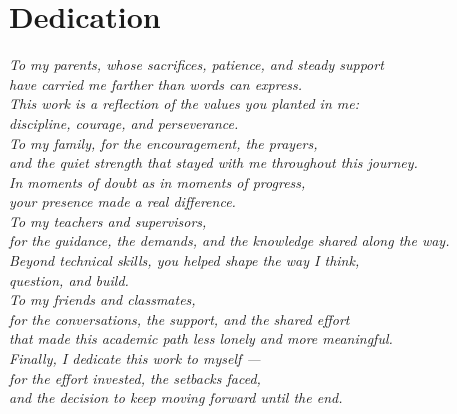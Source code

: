 \documentclass[a4paper,12pt,oneside]{report}
\begin{document}
%



\section*{Dedication}
\vspace*{2cm}

\justifying
\textit{To my parents, whose sacrifices, patience, and steady support}\\
\textit{have carried me farther than words can express.}\\
\textit{This work is a reflection of the values you planted in me:}\\
\textit{discipline, courage, and perseverance.}\\[0.8cm]

\textit{To my family, for the encouragement, the prayers,}\\
\textit{and the quiet strength that stayed with me throughout this journey.}\\
\textit{In moments of doubt as in moments of progress,}\\
\textit{your presence made a real difference.}\\[0.8cm]

\textit{To my teachers and supervisors,}\\
\textit{for the guidance, the demands, and the knowledge shared along the way.}\\
\textit{Beyond technical skills, you helped shape the way I think,}\\
\textit{question, and build.}\\[0.8cm]

\textit{To my friends and classmates,}\\
\textit{for the conversations, the support, and the shared effort}\\
\textit{that made this academic path less lonely and more meaningful.}\\[1cm]

\textit{Finally, I dedicate this work to myself ---}\\
\textit{for the effort invested, the setbacks faced,}\\
\textit{and the decision to keep moving forward until the end.}\\[1.2cm]
\end{document}

